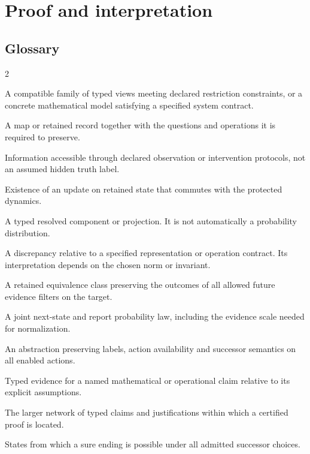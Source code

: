 \documentclass[11pt,oneside,openany]{book}
\theoremstyle{definition}\newtheorem{definition}[theorem]{Definition}
\begin{document}
\part{Proof and interpretation}


\backmatter
\chapter{Glossary}
\begin{multicols}{2}
\small
\begin{description}[style=nextline,itemsep=3pt,parsep=0pt]
\item[Realization] A compatible family of typed views meeting declared restriction constraints, or a concrete mathematical model satisfying a specified system contract.
\item[Representation] A map or retained record together with the questions and operations it is required to preserve.
\item[Evidence] Information accessible through declared observation or intervention protocols, not an assumed hidden truth label.
\item[Predictive closure] Existence of an update on retained state that commutes with the protected dynamics.
\item[Packet] A typed resolved component or projection. It is not automatically a probability distribution.
\item[Residual] A discrepancy relative to a specified representation or operation contract. Its interpretation depends on the chosen norm or invariant.
\item[Correction signature] A retained equivalence class preserving the outcomes of all allowed future evidence filters on the target.
\item[Instrument] A joint next-state and report probability law, including the evidence scale needed for normalization.
\item[Legal-operation quotient] An abstraction preserving labels, action availability and successor semantics on all enabled actions.
\item[Certificate] Typed evidence for a named mathematical or operational claim relative to its explicit assumptions.
\item[Proof field] The larger network of typed claims and justifications within which a certified proof is located.
\item[Ending attractor] States from which a sure ending is possible under all admitted successor choices.

\end{description}
\end{multicols}
\end{document}
